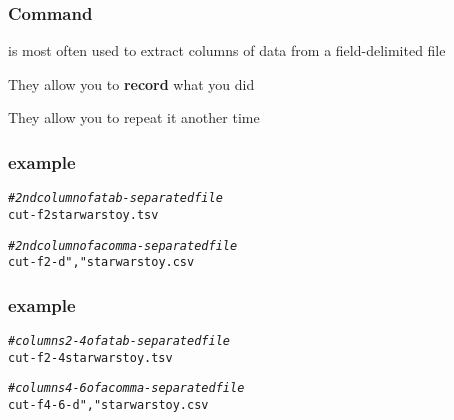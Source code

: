 \documentclass[12pt]{beamer}\usepackage[]{graphicx}\usepackage[]{color}
\makeatletter
\newcommand{\hlstr}[1]{\textcolor[rgb]{0.192,0.494,0.8}{#1}}%
\newcommand{\hlcom}[1]{\textcolor[rgb]{0.678,0.584,0.686}{\textit{#1}}}%
\newenvironment{kframe}{%
 \def\at@end@of@kframe{}%
 \ifinner\ifhmode%
  \def\at@end@of@kframe{\end{minipage}}%
  \begin{minipage}{\columnwidth}%
 \fi\fi%
 \def\FrameCommand##1{\hskip\@totalleftmargin \hskip-\fboxsep
 \colorbox{shadecolor}{##1}\hskip-\fboxsep
     \hskip-\linewidth \hskip-\@totalleftmargin \hskip\columnwidth}%
 \MakeFramed {\advance\hsize-\width
   \@totalleftmargin\z@ \linewidth\hsize
   \@setminipage}}%
 {\par\unskip\endMakeFramed%
 \at@end@of@kframe}
\newenvironment{knitrout}{}{} %
\makeatother
\begin{document}

\begin{frame}
\begin{center}
\Huge{}
\end{center}
\end{frame}


\begin{frame}
\frametitle{Command }

\bbi
  \item {\hilit {}} is most often used to extract columns of data from a field-delimited file
  \item They allow you to \textbf{record} what you did
  \item They allow you to repeat it another time
\ei

\end{frame}


\begin{frame}[fragile]
\frametitle{ example}

\begin{knitrout}\scriptsize
{}\color{fgcolor}\begin{kframe}
\begin{alltt}
\hlcom{# 2nd column of a tab-separated file}
cut -f 2 starwarstoy.tsv


\hlcom{# 2nd column of a comma-separated file}
cut -f 2 -d \hlstr{","} starwarstoy.csv
\end{alltt}
\end{kframe}
\end{knitrout}

\end{frame}


\begin{frame}[fragile]
\frametitle{ example}

\begin{knitrout}\scriptsize
{}\color{fgcolor}\begin{kframe}
\begin{alltt}
\hlcom{# columns 2-4 of a tab-separated file}
cut -f 2-4 starwarstoy.tsv


\hlcom{# columns 4-6 of a comma-separated file}
cut -f 4-6 -d \hlstr{","} starwarstoy.csv
\end{alltt}
\end{kframe}
\end{knitrout}

\end{frame}
\end{document}
